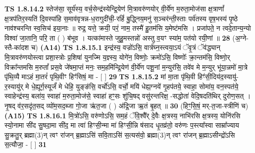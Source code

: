 \documentclass[17pt]{extarticle}
\begin{document}
                  \newline
                                \textbf{ TS 1.8.14.2} \newline
                  स्तेज॑सा॒ सूर्य॑स्य॒ वर्च॒सेन्द्र॑स्येन्द्रि॒येण॑ मि॒त्रावरु॑णयोर् वी॒र्ये॑ण म॒रुता॒मोज॑सा क्ष॒त्राणां᳚ क्ष॒त्रप॑तिर॒स्यति॑ दि॒वस्पा॑हि स॒माव॑वृत्रन्न-ध॒रागुदी॑ची॒-रहिं॑ बु॒द्ध्निय॒मनु॑ स॒ञ्चर॑न्ती॒स्ताः पर्व॑तस्य वृष॒भस्य॑ पृ॒ष्ठे नाव॑श्चरन्ति स्व॒सिच॑ इया॒नाः ॥ रुद्र॒ यत्ते॒ क्रयी॒ परं॒ नाम॒ तस्मै॑ हु॒तम॑सि य॒मेष्ट॑मसि । प्रजा॑पते॒ न त्वदे॒तान्य॒न्यो विश्वा॑ जा॒तानि॒ परि॒ ता ( ) ब॑भूव । यत्का॑मास्ते जुहु॒मस्तन्नो॑ अस्तु व॒यꣳ स्या॑म॒ पत॑यो रयी॒णां ॥ \textbf{  28 } \newline
                  \newline
                      (अ॒ग्ने-स्तै-का॑दश च)  \textbf{(A14)} \newline \newline
                                        \textbf{ TS 1.8.15.1} \newline
                  इन्द्र॑स्य॒ वज्रो॑ऽसि॒ वार्त्र॑घ्न॒स्त्वया॒ऽयं ॅवृ॒त्रं ॅव॑द्ध्यान् मि॒त्रावरु॑णयोस्त्वा प्रशा॒स्त्रोः प्र॒शिषा॑ युनज्मि य॒ज्ञ्स्य॒ योगे॑न॒ विष्णोः॒ क्रमो॑ऽसि॒ विष्णोः᳚ क्रा॒न्तम॑सि॒ विष्णो॒र् विक्रा᳚न्तमसि म॒रुतां᳚ प्रस॒वे जे॑षमा॒प्तं मनः॒ सम॒हमि॑न्द्रि॒येण॑ वी॒र्ये॑ण पशू॒नां म॒न्युर॑सि॒ तवे॑व मे म॒न्युर् भू॑या॒न्नमो॑ मा॒त्रे पृ॑थि॒व्यै माऽहं मा॒तरं॑ पृथि॒वीꣳ हिꣳ॑सिषं॒ मा - [ ] \textbf{  29} \newline
                  \newline
                                \textbf{ TS 1.8.15.2} \newline
                  मां मा॒ता पृ॑थि॒वी हिꣳ॑सी॒दिय॑द॒स्यायु॑-र॒स्यायु॑र् मे धे॒ह्यूर्ग॒स्यूर्जं॑ मे धेहि॒ युङ्ङ॑सि॒ वर्चो॑ऽसि॒ वर्चो॒ मयि॑ धेह्य॒ग्नये॑ गृ॒हप॑तये॒ स्वाहा॒ सोमा॑य॒ वन॒स्पत॑ये॒ स्वाहेन्द्र॑स्य॒ बला॑य॒ स्वाहा॑ म॒रुता॒मोज॑से॒ स्वाहा॑ हꣳ॒॒सः शु॑चि॒षद् वसु॑रन्तरिक्ष॒ -सद्धोता॑ वेदि॒षदति॑थिर् दुरोण॒सत् । नृ॒षद् व॑र॒सदृ॑त॒सद् व्यो॑म॒सद॒ब्जा गो॒जा ऋ॑त॒जा ( ) अ॑द्रि॒जा ऋ॒तं बृ॒हत् ॥ \textbf{  30} \newline
                  \newline
                      (हिꣳ॒॒सि॒षं॒ मर्-त॒जा-स्त्रीणि॑ च)  \textbf{(A15)} \newline \newline
                                        \textbf{ TS 1.8.16.1} \newline
                  मि॒त्रो॑ऽसि॒ वरु॑णोऽसि॒ सम॒हं ॅवि॒श्वै᳚र् दे॒वैः क्ष॒त्रस्य॒ नाभि॑रसि क्ष॒त्रस्य॒ योनि॑रसि स्यो॒नामा सी॑द सु॒षदा॒मा सी॑द॒ मा त्वा॑ हिꣳसी॒न्मा मा॑ हिꣳसी॒न्नि ष॑साद धृ॒तव्र॑तो॒ वरु॑णः प॒स्त्या᳚स्वा साम्रा᳚ज्याय सु॒क्रतु॒र् ब्रह्मा(3)न् त्वꣳ रा॑जन् ब्र॒ह्माऽसि॑ सवि॒ताऽसि॑ स॒त्यस॑वो॒ ब्रह्मा(3)न् त्वꣳ रा॑जन् ब्र॒ह्माऽसीन्द्रो॑ऽसि स॒त्यौजा॒ - [ ] \textbf{  31} \newline
\end{document}
